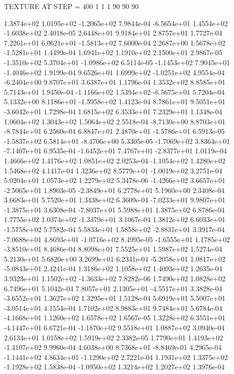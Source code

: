 TEXTURE AT STEP = 400
1 1 1
90 90 90

 1.3874e+02  1.0195e+02 -1.2065e+02  7.9844e-04
-6.5654e+01  1.4554e+02 -1.6038e+02  2.4018e-05
2.6448e+01 9.9184e+01 2.8757e+01  1.7727e-04
 7.2261e+01  6.0621e+01 -1.5813e+02  7.6000e-04
 2.2687e+00  1.5678e+02 -1.5281e+01  1.4499e-04
1.6941e+02 1.1910e+02 2.1500e+01  2.9867e-05
-1.3510e+02  5.3704e+01 -1.0986e+02  6.5114e-05
-1.1453e+02  7.9045e+01 -1.4046e+02  1.9199e-04
 9.6526e+01  1.6999e+02 -1.0251e+02  4.9554e-04
-6.2404e+00  9.8707e+01  3.6387e+01  1.1796e-04
1.3532e+02 8.8585e+01 5.7143e+01  1.9450e-04
-1.1166e+02  1.5394e+02 -6.5675e+01  5.7204e-04
 5.1332e+00  8.1186e+01 -1.5958e+02  1.4123e-04
 8.7861e+01  9.5051e+01 -3.6042e+01  1.7298e-04
1.6815e+02 6.3533e+01 7.2329e+01  1.1348e-04
1.0604e+02 1.3043e+02 1.5064e+02  2.5518e-04
-8.7130e+00  8.8703e+01 -8.7844e+01  6.2560e-04
 6.8847e+01  2.4870e+01 -1.5786e+01  6.5913e-05
-1.5837e+02  6.5814e+01 -8.4706e+00  5.3305e-05
-1.7069e+02  3.8364e+01 -7.1407e+01  6.9535e-04
-1.6452e+01  7.4767e+01 -2.8377e+01  1.0119e-04
1.4666e+02 1.4176e+02 1.0851e+02  2.0253e-04
-1.1054e+02  1.4280e+02  1.5468e+02  4.1417e-04
 1.3236e+02  8.5779e+01 -1.0019e+02  3.2751e-04
5.0204e+01 1.0573e+02 1.2279e+02  5.3478e-06
-1.4266e+02  3.6657e+01 -2.5065e+01  1.8903e-05
-2.3849e+01  6.2778e+01  5.1960e+00  2.3408e-04
3.6683e+01 5.7520e+01 1.3438e+02  6.3609e-04
-7.0233e+01  9.9807e+01 -1.3875e+01  3.6308e-04
-7.8037e+01  5.5988e+01  1.3875e+02  6.8786e-04
 1.7755e+02  1.0374e+02 -1.3379e+01  3.1067e-04
 1.3812e+02  6.6033e+01 -1.5758e+02  5.7582e-04
 5.5833e+01  1.5858e+02 -2.8831e+01  3.3917e-04
-7.0688e+01  4.8693e+01 -1.0716e+02  8.4995e-05
-1.6555e+01  1.1785e+02 -3.8510e+01  8.4686e-04
8.8098e+01 7.5525e+01 1.5987e+02  1.5274e-04
5.2130e+01 5.6820e+00 3.2699e+01  6.2341e-04
-5.2058e+01  1.0817e+02 -5.0843e+01  2.4241e-04
1.3186e+02 1.1058e+02 1.4093e+02  1.2635e-04
 3.9323e+01  1.1502e+02 -1.3633e+02  7.8282e-06
1.7490e+02 1.0828e+02 6.7496e+01  5.1042e-04
 7.8057e+01  2.1305e+01 -4.5517e+01  3.3828e-04
-3.6552e+01  1.3627e+02  1.3295e+01  1.5128e-04
 5.6919e+01  5.5007e+01 -3.0514e+01  4.1554e-04
1.7102e+02 8.9883e+01 9.7484e+01  5.6784e-04
-4.1668e+01  1.1260e+02  1.6578e+02  1.6567e-05
 1.3228e+02  6.3551e+01 -4.1447e+01  6.6721e-04
-1.1870e+02  9.5518e+01  1.0887e+02  3.0940e-04
2.6134e+01 1.0158e+02 1.5919e+02  2.3382e-05
 1.7790e+01  1.4193e+02 -1.4107e+02  9.9960e-04
 4.6038e+00  8.7368e+01 -8.8469e-01  4.2965e-04
-1.1441e+02  4.8634e+01 -1.1290e+02  2.7221e-04
 1.1931e+02  1.3375e+02 -1.1928e+02  1.5838e-04
-1.0950e+02  1.3214e+02  1.2027e+02  1.3976e-04
